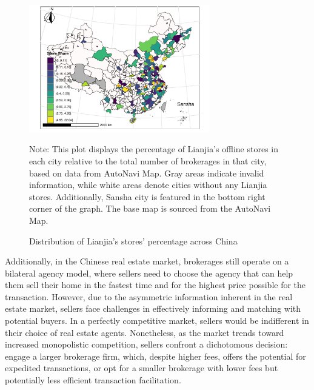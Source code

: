 \documentclass[11pt]{article}
\begin{document}
\begin{figure}[H]
  \centering
  \includegraphics[width=0.7\textwidth]{../figures/distribution_of_cities_share.pdf}
  \caption{Distribution of Lianjia's stores' percentage across China}
  \label{fig:precise_proportion_contraction}
  Note: This plot displays the percentage of Lianjia's offline stores in each city relative to the total number of brokerages in that city, based on data from AutoNavi Map. Gray areas indicate invalid information, while white areas denote cities without any Lianjia stores. Additionally, Sansha city is featured in the bottom right corner of the graph. The base map is sourced from the AutoNavi Map.
\end{figure}

Additionally, in the Chinese real estate market, brokerages still operate on a bilateral agency model, where sellers need to choose the agency that can help them sell their home in the fastest time and for the highest price possible for the transaction. However, due to the asymmetric information inherent in the real estate market, sellers face challenges in effectively informing and matching with potential buyers. In a perfectly competitive market, sellers would be indifferent in their choice of real estate agents. Nonetheless, as the market trends toward increased monopolistic competition, sellers confront a dichotomous decision: engage a larger brokerage firm, which, despite higher fees, offers the potential for expedited transactions, or opt for a smaller brokerage with lower fees but potentially less efficient transaction facilitation.
\end{document}
